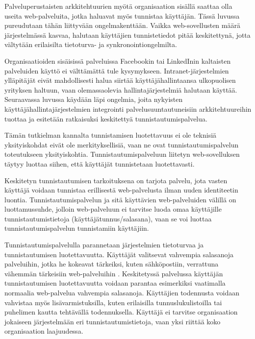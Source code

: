 Palveluperustaisten arkkitehtuurien myötä organisaation sisällä saattaa olla useita web-palveluita, jotka haluavat myös tunnistaa käyttäjän. Tässä luvussa pureudutaan tähän liittyvään ongelmakenttään. Vaikka web-sovellusten määrä järjestelmässä kasvaa, halutaan käyttäjien tunnistetiedot pitää keskitettynä, jotta vältytään erilaisilta tietoturva- ja synkronointiongelmilta.

Organisaatioiden sisäisissä palveluissa Facebookin tai LinkedInin kaltaisten palveluiden käyttö ei välttämättä tule kysymykseen. Intranet-järjestelmien ylläpitäjät eivät mahdollisesti halua siirtää käyttäjähallintaansa ulkopuolisen yrityksen haltuun, vaan olemassaolevia hallintajärjestelmiä halutaan käyttää. Seuraavassa luvussa käydään läpi ongelmia, joita nykyisten käyttäjähallintajärjestelmien integrointi palvelusuuntautuneisiin arkkitehtuureihin tuottaa ja esitetään ratkaisuksi keskitettyä tunnistautumispalvelua.





Tämän tutkielman kannalta tunnistamisen luotettavuus ei ole teknisiä yksityiskohdat eivät ole merkityksellisiä, vaan ne ovat tunnistautumispalvelun toteutukseen yksityiskohtia. Tunnistautumispalveluun liitetyn web-sovelluksen täytyy luottaa siihen, että käyttäjät tunnistetaan luotettavasti.




Keskitetyn tunnistautumisen tarkoituksena on tarjota palvelu, jota vasten käyttäjä voidaan tunnistaa erillisestä web-palvelusta ilman uuden identiteetin luontia. Tunnistautumispalvelun ja sitä käyttävien web-palveluiden välillä on luottamussuhde, jolloin web-palveluun ei tarvitse luoda omaa käyttäjille tunnistautumistietoja (käyttäjätunnus/salasana), vaan se voi luottaa tunnistautumispalvelun tunnistamiin käyttäjiin.

Tunnistautumispalvelulla parannetaan järjestelmien tietoturvaa ja tunnistautumisen luotettavuutta. Käyttäjät valitsevat vahvempia salasanoja palveluihin, jotka he kokeavat tärkeiksi, kuten sähköpostiin, verrattuna vähemmän tärkeisiin web-palveluihin \cite{password_habits}. Keskitetyssä palvelussa käyttäjän tunnistautumisen luotettavuutta voidaan parantaa esimerkiksi vaatimalla normaalia web-palvelua vahvempia salasanoja. Käyttäjien todennusta voidaan vahvistaa myös lisävarmistuksilla, kuten erilaisilla tunnuslukulistoilla tai puhelimen kautta tehtävällä todennuksella. Käyttäjä ei tarvitse organisaation jokaiseen järjestelmään eri tunnistautumistietoja, vaan yksi riittää koko organisaation laajuudessa.


